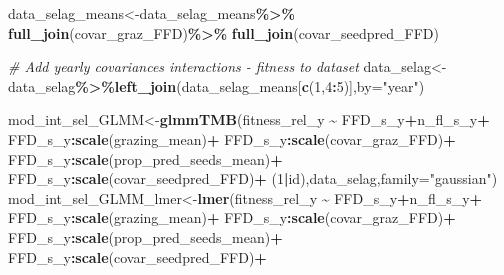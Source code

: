\documentclass[
]{article}
\newenvironment{Shaded}{\begin{snugshade}}{\end{snugshade}}
\newcommand{\CommentTok}[1]{\textcolor[rgb]{0.56,0.35,0.01}{\textit{#1}}}
\newcommand{\DataTypeTok}[1]{\textcolor[rgb]{0.13,0.29,0.53}{#1}}
\newcommand{\DecValTok}[1]{\textcolor[rgb]{0.00,0.00,0.81}{#1}}
\newcommand{\KeywordTok}[1]{\textcolor[rgb]{0.13,0.29,0.53}{\textbf{#1}}}
\newcommand{\NormalTok}[1]{#1}
\newcommand{\OperatorTok}[1]{\textcolor[rgb]{0.81,0.36,0.00}{\textbf{#1}}}
\newcommand{\StringTok}[1]{\textcolor[rgb]{0.31,0.60,0.02}{#1}}
\begin{document}
\begin{Shaded}
\begin{Highlighting}[]
\NormalTok{data\_selag\_means\textless{}{-}data\_selag\_means}\OperatorTok{\%\textgreater{}\%}
\StringTok{  }\KeywordTok{full\_join}\NormalTok{(covar\_graz\_FFD)}\OperatorTok{\%\textgreater{}\%}
\StringTok{  }\KeywordTok{full\_join}\NormalTok{(covar\_seedpred\_FFD)}

\CommentTok{\# Add yearly covariances interactions {-} fitness to dataset }
\NormalTok{data\_selag\textless{}{-}data\_selag}\OperatorTok{\%\textgreater{}\%}\KeywordTok{left\_join}\NormalTok{(data\_selag\_means[}\KeywordTok{c}\NormalTok{(}\DecValTok{1}\NormalTok{,}\DecValTok{4}\OperatorTok{:}\DecValTok{5}\NormalTok{)],}\DataTypeTok{by=}\StringTok{"year"}\NormalTok{)}
\end{Highlighting}
\end{Shaded}

\begin{Shaded}
\begin{Highlighting}[]
\NormalTok{mod\_int\_sel\_GLMM\textless{}{-}}\KeywordTok{glmmTMB}\NormalTok{(fitness\_rel\_y }\OperatorTok{\textasciitilde{}}\StringTok{ }\NormalTok{FFD\_s\_y}\OperatorTok{+}\NormalTok{n\_fl\_s\_y}\OperatorTok{+}
\StringTok{                            }\NormalTok{FFD\_s\_y}\OperatorTok{:}\KeywordTok{scale}\NormalTok{(grazing\_mean)}\OperatorTok{+}
\StringTok{                            }\NormalTok{FFD\_s\_y}\OperatorTok{:}\KeywordTok{scale}\NormalTok{(covar\_graz\_FFD)}\OperatorTok{+}
\StringTok{                            }\NormalTok{FFD\_s\_y}\OperatorTok{:}\KeywordTok{scale}\NormalTok{(prop\_pred\_seeds\_mean)}\OperatorTok{+}
\StringTok{                            }\NormalTok{FFD\_s\_y}\OperatorTok{:}\KeywordTok{scale}\NormalTok{(covar\_seedpred\_FFD)}\OperatorTok{+}
\StringTok{                            }\NormalTok{(}\DecValTok{1}\OperatorTok{|}\NormalTok{id),data\_selag,}\DataTypeTok{family=}\StringTok{"gaussian"}\NormalTok{)}
\NormalTok{mod\_int\_sel\_GLMM\_lmer\textless{}{-}}\KeywordTok{lmer}\NormalTok{(fitness\_rel\_y }\OperatorTok{\textasciitilde{}}\StringTok{ }\NormalTok{FFD\_s\_y}\OperatorTok{+}\NormalTok{n\_fl\_s\_y}\OperatorTok{+}
\StringTok{                              }\NormalTok{FFD\_s\_y}\OperatorTok{:}\KeywordTok{scale}\NormalTok{(grazing\_mean)}\OperatorTok{+}
\StringTok{                              }\NormalTok{FFD\_s\_y}\OperatorTok{:}\KeywordTok{scale}\NormalTok{(covar\_graz\_FFD)}\OperatorTok{+}
\StringTok{                              }\NormalTok{FFD\_s\_y}\OperatorTok{:}\KeywordTok{scale}\NormalTok{(prop\_pred\_seeds\_mean)}\OperatorTok{+}
\StringTok{                              }\NormalTok{FFD\_s\_y}\OperatorTok{:}\KeywordTok{scale}\NormalTok{(covar\_seedpred\_FFD)}\OperatorTok{+}

\end{Highlighting}
\end{Shaded}
\end{document}
